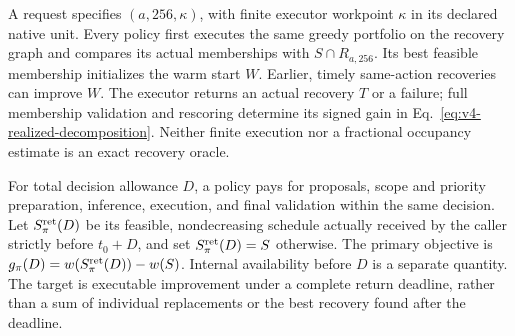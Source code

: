 A request specifies $(a,256,\kappa)$, with finite executor workpoint $\kappa$
in its declared native unit. Every policy first executes the same greedy
portfolio on the recovery graph and compares its actual memberships with
$S\cap R_{a,256}$. Its best feasible membership initializes the warm start
$W$. Earlier, timely same-action recoveries can improve $W$. The executor returns an actual recovery $T$
or a failure; full membership validation and rescoring determine its signed
gain in Eq.~\eqref{eq:v4-realized-decomposition}. Neither finite execution
nor a fractional occupancy estimate is an exact recovery oracle.

For total decision allowance $D$, a policy pays for proposals, scope and
priority preparation, inference, execution, and final validation within the
same decision. Let $S_\pi^{\rm ret}(D)$ be its feasible, nondecreasing
schedule actually received by the caller strictly before $t_0+D$, and set
$S_\pi^{\rm ret}(D)=S$ otherwise. The primary objective is
$g_\pi(D)=w(S_\pi^{\rm ret}(D))-w(S)$.
Internal availability before $D$ is a separate quantity. The target is
executable improvement under a complete return deadline, rather than a sum
of individual replacements or the best recovery found after the deadline.
